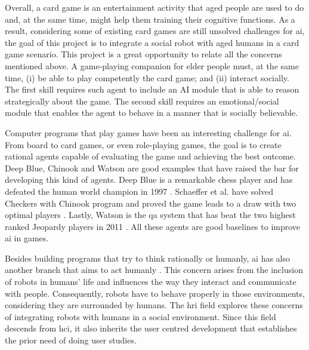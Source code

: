 Overall, a card game is an entertainment activity that aged people are used to do and, at the same time, might help them training their cognitive functions.
As a result, considering some of existing card games are still unsolved challenges for \gls{ai}, the goal of this project is to integrate a social robot with aged humans in a card game scenario.
This project is a great opportunity to relate all the concerns mentioned above.
A game-playing companion for elder people must, at the same time, (i) be able to play competently the card game; and (ii) interact socially. The first skill requires such agent to include an AI module that is able to reason strategically about the game. The second skill requires an emotional/social module that enables the agent to behave in a manner that is socially believable.


Computer programs that play games have been an interesting challenge for \gls{ai}.
From board to card games, or even role-playing games, the goal is to create rational agents capable of evaluating the game and achieving the best outcome.
Deep Blue, Chinook and Watson are good examples that have raised the bar for developing this kind of agents.
Deep Blue is a remarkable chess player and has defeated the human world champion in 1997 \cite{Campbell2002}.
Schaeffer et al. have solved Checkers with Chinook program and proved the game leads to a draw with two optimal players \cite{Schaeffer1996}.
Lastly, Watson is the \gls{qa} system that has beat the two highest ranked Jeopardy players in 2011 \cite{Ferrucci2010}.
All these agents are good baselines to improve \gls{ai} in games.


Besides building programs that try to think rationally or humanly, \gls{ai} has also another branch that aims to act humanly \cite{Russell2009}.
This concern arises from the inclusion of robots in humans' life and influences the way they interact and communicate with people.
Consequently, robots have to behave properly in those environments, considering they are surrounded by humans.
The \gls{hri} field explores these concerns of integrating robots with humans in a social environment.
Since this field descends from \gls{hci}, it also inherits the user centred development that establishes the prior need of doing user studies.


